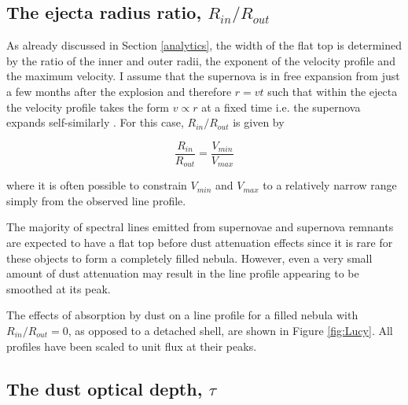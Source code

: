 \subsection{The ejecta radius ratio, $R_{in}/R_{out}$}

As already discussed in Section \ref{analytics}, the width of the flat top 
is determined by the ratio of the inner and outer radii, the exponent of 
the velocity profile and the maximum velocity.  I assume that the 
supernova is in free expansion from just a few months after the explosion 
and therefore $r=vt$ such that within the ejecta the velocity profile 
takes the form $v \propto r$ at a fixed time i.e. the supernova expands 
self-similarly \citep{Li1992,Xu1992,Kozma1998b}.  For this case, 
$R_{in}/R_{out}$ is given by

\begin{equation}
\frac{R_{in}}{R_{out}}=\frac{V_{min}}{V_{max}}
\end{equation}

\noindent where it is often possible to constrain $V_{min}$ and $V_{max}$ 
to a relatively narrow range simply from the observed line profile.

The majority of spectral lines emitted from supernovae and supernova 
remnants are expected to have a flat top before dust attenuation effects 
since it is rare for these objects to form a completely filled nebula.  
However, even a very small amount of dust attenuation may result in the 
line profile appearing to be smoothed at its peak.

The effects of absorption by dust on a line profile for a filled nebula 
with $R_{in}/R_{out}=0$, as opposed to a detached shell, are shown in 
Figure \ref{fig:Lucy}. 
All profiles have been scaled to unit flux at their peaks.

\subsection{The dust optical depth, $\tau$}
\label{tau}

